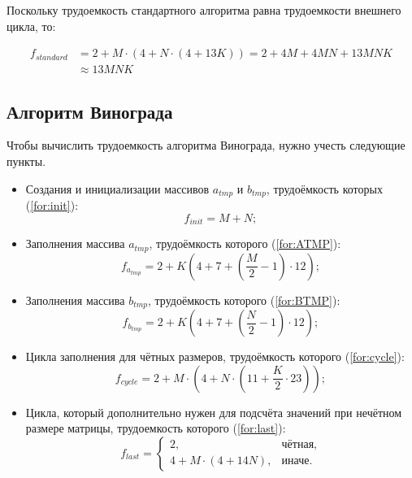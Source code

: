 Поскольку трудоемкость стандартного алгоритма равна трудоемкости внешнего цикла, то:

\begin{align}
	\label{for:standard}
	f_{standard} &= 2 + M \cdot (4 + N \cdot (4 + 13K)) = 2 + 4M + 4MN + 13MNK\\ &\approx 13MNK
\end{align}


\subsection{Алгоритм Винограда}

Чтобы вычислить трудоемкость алгоритма Винограда, нужно учесть следующие пункты.

\begin{itemize}
	\item Создания и инициализации массивов $a_{tmp}$ и $b_{tmp}$, трудоёмкость которых (\ref{for:init}):
	\begin{equation}
		\label{for:init}
		f_{init} = M + N;
	\end{equation}
	
	\item Заполнения массива $a_{tmp}$, трудоёмкость которого (\ref{for:ATMP}):
	\begin{equation}
			\label{for:ATMP}
		f_{a_{tmp}} = 2 + K (4 + 7 +  (\frac{M}{2} - 1)  \cdot 12);
	\end{equation}
	
	\item Заполнения массива $b_{tmp}$, трудоёмкость которого (\ref{for:BTMP}):
	\begin{equation}
			\label{for:BTMP}
		f_{b_{tmp}} = 2 + K (4 + 7 + (\frac{N}{2} - 1) \cdot 12);
	\end{equation}

	
	\item Цикла заполнения для чётных размеров, трудоёмкость которого (\ref{for:cycle}):
	\begin{equation}
		\label{sfor:cycle}
		f_{cycle} = 2 + M \cdot (4 + N \cdot (11 + \frac{K}{2} \cdot 23));
	\end{equation}
	
	\item Цикла, который дополнительно нужен для подсчёта значений при нечётном размере матрицы, трудоемкость которого (\ref{for:last}):
	\begin{equation}
		\label{for:last}
		f_{last} = \begin{cases}
			2, & \text{чётная,}\\
			4 + M \cdot (4 + 14N), & \text{иначе.}
		\end{cases}
	\end{equation}
\end{itemize}

